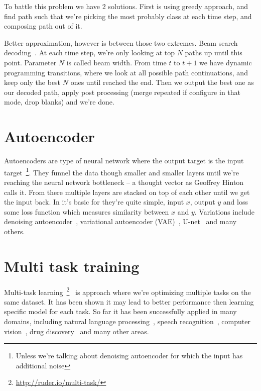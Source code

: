 \documentclass[times, utf8, diplomski, english]{fer}
\begin{document}
To battle this problem we have 2 solutions. First is using greedy approach, and find path such that we're picking the most probably class at each time step, and composing path out of it.

Better approximation, however is between those two extremes. Beam search decoding~\cite{graves_decode}. At each time step, we're only looking at top $N$ paths up until this point. Parameter $N$ is called beam width. From time $t$ to $t+1$ we have dynamic programming transitions, where we look at all possible path continuations, and keep only the best $N$ ones until reached the end. Then we output the best one as our decoded path, apply post processing (merge repeated if configure in that mode, drop blanks) and we're done.

\section{Autoencoder}
\label{sec:autoencoder}
Autoencoders are type of neural network where the output target is the input target~\footnote{Unless we're talking about denoising autoencoder for which the input has additional noise}. They funnel the data though smaller and smaller layers until we're reaching the neural network bottleneck -- a thought vector as Geoffrey Hinton calls it.  From there multiple layers are stacked on top of each other until we get the input back. In it's basic for they're quite simple, input $x$, output $y$ and loss some loss function which measures similarity between $x$ and $y$. Variations include denoising autoencoder~\citep{vincent2008extracting}, variational autoencoder (VAE)~\citep{kingma2013auto}, U-net~\citep{DBLP:journals/corr/RonnebergerFB15} and many others. 

\section{Multi task training}
Multi-task learning~\footnote{\url{http://ruder.io/multi-task/}}~\citep{multi-task-learning,Caruana1997,DBLP:journals/corr/abs-1106-0245} is approach where we're optimizing multiple tasks on the same dataset. 
It has been shown it may lead to better performance then learning specific model for each task. 
So far it has been successfully applied in many domains, including natural language processing~\citep{Collobert:2008:UAN:1390156.1390177}, speech recognition~\citep{speech_multitask}, computer vision~\citep{cv-multitask}, drug discovery~\citep{ramsundar2015massively} and many other areas. 
\end{document}
